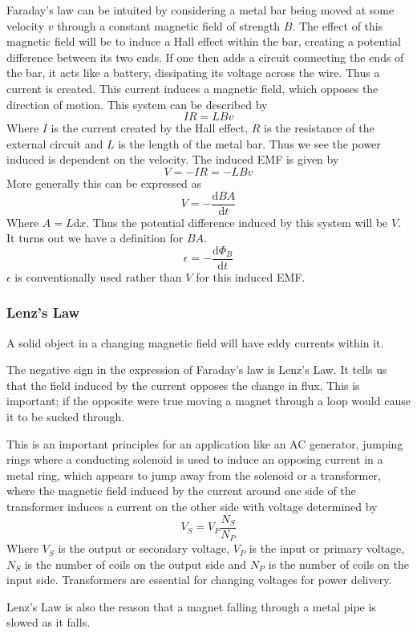 \documentclass[12pt]{report}
\begin{document}
\begin{flushleft}
\bigskip
Faraday's law can be intuited by considering a metal bar being moved at some
velocity \(v\) through a constant magnetic field of strength \(B\). The effect
of this magnetic field will be to induce a Hall effect within the bar, creating
a potential difference between its two ends. If one then adds a circuit
connecting the ends of the bar, it acts like a battery, dissipating its voltage
across the wire. Thus a current is created. This current induces a magnetic
field, which opposes the direction of motion. This system can be described
by
\[IR = LBv\]
Where \(I\) is the current created by the Hall effect, \(R\) is the resistance
of the external circuit and \(L\) is the length of the metal bar. Thus we see
the power induced is dependent on the velocity. The induced EMF is given by
\[V = -IR = -LBv\]
More generally this can be expressed as
\[V = -\frac{\mathrm{d}BA}{\mathrm{d}t}\]
Where \(A = L\mathrm{d}x\). Thus the potential difference induced by this
system will be \(V\). It turns out we have a definition for \(BA\).
\[\epsilon = -\frac{\mathrm{d}\Phi_B}{\mathrm{d}t}\]
\(\epsilon\) is conventionally used rather than \(V\) for this induced EMF.

\subsubsection*{Lenz's Law}

A solid object in a changing magnetic field will have eddy currents within it.
\par
The negative sign in the expression of Faraday's law is Lenz's Law. It tells us
that the field induced by the current opposes the change in flux. This is
important; if the opposite were true moving a magnet through a loop would cause
it to be sucked through. \par
This is an important principles for an application like an AC generator,
jumping rings where a conducting solenoid is used to induce an opposing current
in a metal ring, which appears to jump away from the solenoid or a transformer,
where the magnetic field induced by the current around one side of the
transformer induces a current on the other side with voltage determined by
\[V_S = V_P\frac{N_S}{N_P}\]
Where \(V_S\) is the output or secondary voltage, \(V_P\) is the input or
primary voltage, \(N_S\) is the number of coils on the output side and \(N_P\)
is the number of coils on the input side. Transformers are essential for
changing voltages for power delivery. \par
Lenz's Law is also the reason that a magnet falling through a metal pipe is
slowed as it falls. 


\end{flushleft}
\end{document}
